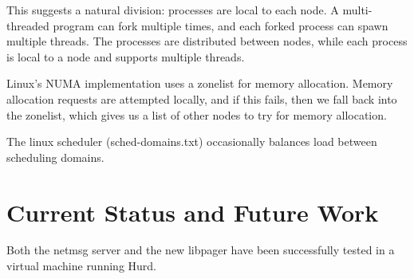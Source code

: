 \documentclass{article}
\begin{document}
This suggests a natural division: processes are local to each node.  A
multi-threaded program can fork multiple times, and each forked
process can spawn multiple threads.  The processes are distributed
between nodes, while each process is local to a node and supports
multiple threads.

Linux's NUMA implementation uses a zonelist for memory allocation.
Memory allocation requests are attempted locally, and if this fails,
then we fall back into the zonelist, which gives us a list of other
nodes to try for memory allocation.

The linux scheduler (sched-domains.txt) occasionally balances
load between scheduling domains.


\section{Current Status and Future Work}

Both the netmsg server and the new libpager have been successfully
tested in a virtual machine running Hurd.
\end{document}
